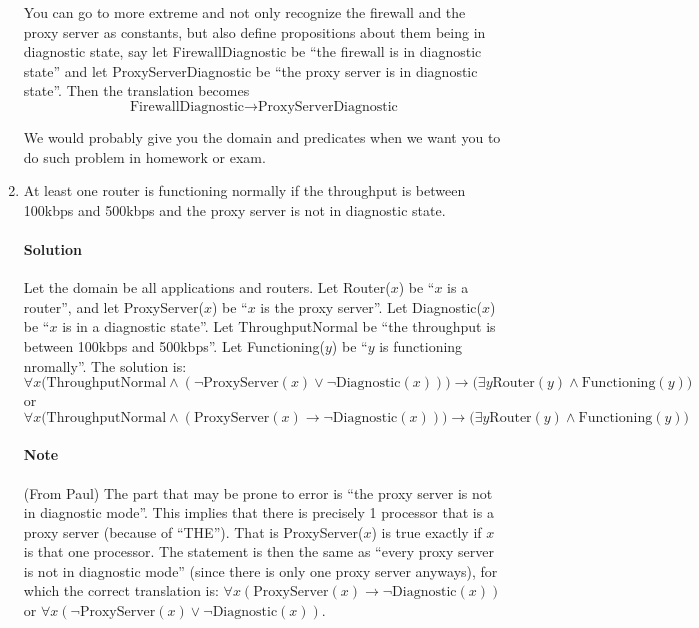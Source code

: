\documentclass[10pt]{article}
\newcommand{\mapto}{\rightarrow}
\begin{document}
\begin{enumerate}[label=(\alph*)]
\qquad You can go to more extreme and not only recognize the firewall and the proxy server as constants, but also define propositions about them being in diagnostic state, say let FirewallDiagnostic be ``the firewall is in diagnostic state'' and let ProxyServerDiagnostic be ``the proxy server is in diagnostic state''. Then the translation becomes
\begin{equation}
  \text{FirewallDiagnostic} \mapto \text{ProxyServerDiagnostic}
\end{equation}

We would probably give you the domain and predicates when we want you to do such problem in homework or exam.

\newpage
\item At least one router is functioning normally if the throughput is between 100kbps and 500kbps and the proxy server is not in diagnostic state.

  \paragraph{Solution} Let the domain be all applications and routers. Let Router($x$) be ``$x$ is a router'', and let ProxyServer($x$) be ``$x$ is the proxy server''. Let Diagnostic($x$) be ``$x$ is in a diagnostic state''. Let ThroughputNormal be ``the throughput is between 100kbps and 500kbps''. Let Functioning($y$) be ``$y$ is functioning nromally''. The solution is:
  \begin{equation}
   \forall x\Big(\text{ThroughputNormal}\land(\lnot\text{ProxyServer}(x)\lor\lnot\text{Diagnostic}(x))\Big)\mapto\Big(\exists y\text{Router}(y)\land\text{Functioning}(y)\Big)
  \end{equation}
or
  \begin{equation}
   \forall x\Big(\text{ThroughputNormal}\land(\text{ProxyServer}(x)\mapto\lnot\text{Diagnostic}(x))\Big)\mapto\Big(\exists y\text{Router}(y)\land\text{Functioning}(y)\Big)
  \end{equation}

  \paragraph{Note} (From Paul) The part that may be prone to error is ``the proxy server is not in diagnostic mode''.  This implies that there is precisely 1 processor that is a proxy server (because of ``THE''). That is ProxyServer($x$) is true exactly if $x$ is that one processor. The statement is then the same as ``every proxy server is not in diagnostic mode'' (since there is only one proxy server anyways), for which the correct translation is: $\forall x (\text{ProxyServer}(x)\mapto \lnot\text{Diagnostic}(x))$ or $\forall x (\lnot\text{ProxyServer}(x)\lor\lnot\text{Diagnostic}(x))$.

\end{enumerate}
\end{document}

